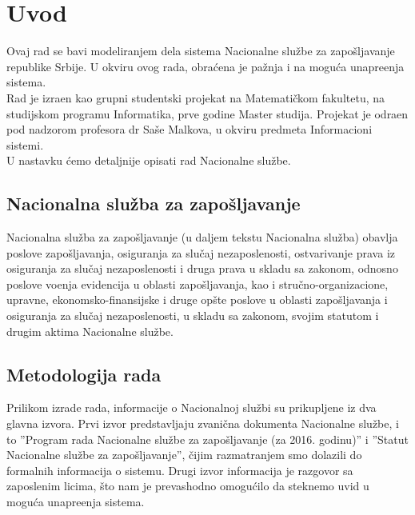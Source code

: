 \section{Uvod}

Ovaj rad se bavi modeliranjem dela sistema Nacionalne slu\v zbe za zapo\v sljavanje republike Srbije. U okviru ovog rada, obra\' cena je pa\v znja i na mogu\' ca unapre\dj enja sistema.\\

Rad je izra\dj en kao grupni studentski projekat na Matemati\v ckom fakultetu, na studijskom programu Informatika, prve godine Master studija. Projekat je odra\dj en pod nadzorom profesora dr Sa\v se Malkova, u okviru predmeta Informacioni sistemi.\\

U nastavku \' cemo detaljnije opisati rad Nacionalne slu\v zbe.

\subsection{Nacionalna slu\v zba za zapo\v sljavanje}

Nacionalna slu\v zba za zapo\v sljavanje (u daljem tekstu Nacionalna slu\v zba) obavlja poslove zapo\v sljavanja, osiguranja za slu\v caj nezaposlenosti, ostvarivanje prava iz osiguranja za slu\v caj nezaposlenosti i druga prava u skladu sa zakonom, odnosno poslove vo\dj enja evidencija u oblasti zapo\v sljavanja, kao i stru\v cno-organi\-zacione, upravne, ekonomsko-finansijske i druge op\v ste poslove u oblasti zapo\v sljavanja i osiguranja za slu\v caj nezaposlenosti, u skladu sa zakonom, svojim statutom i drugim aktima Nacionalne slu\v zbe.

\subsection{Metodologija rada}

Prilikom izrade rada, informacije o Nacionalnoj slu\v zbi su prikupljene iz dva glavna izvora. Prvi izvor predstavljaju zvani\v cna dokumenta Nacionalne slu\v zbe, i to ''Program rada Nacionalne slu\v zbe za zapo\v sljavanje (za 2016. godinu)'' i ''Statut Nacionalne slu\v zbe za zapo\v sljavanje'', \v cijim razmatranjem smo dolazili do formalnih informacija o sistemu. Drugi izvor informacija je razgovor sa zaposlenim licima, \v sto nam je prevashodno omogu\' cilo da steknemo uvid u mogu\' ca unapre\dj enja sistema.\\

